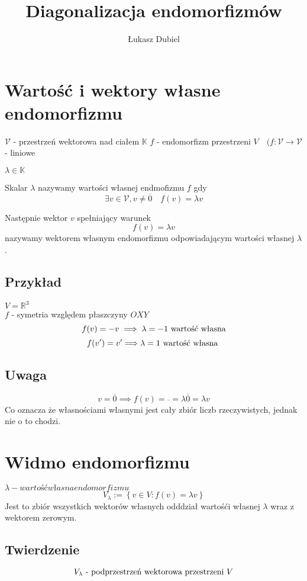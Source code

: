 \documentclass[11pt]{article}
\author{Łukasz Dubiel}
\title{Diagonalizacja endomorfizmów}
\begin{document}
\maketitle

\section{Wartość i wektory własne endomorfizmu}

$\mathcal{V}$ - przestrzeń wektorowa nad ciałem $\mathbb{K}$
$f$ - endomorfizm przestrzeni $V \quad (f : \mathcal{V} \to \mathcal{V}$ - liniowe

$ \lambda \in \mathbb{K} $

Skalar $\lambda$ nazywamy wartości własnej endmofizmu $f$ gdy $$ \exists v \in \mathcal{V}, v \not = \overline{0} \quad f(v) = \lambda v $$

Następnie wektor $v$ spełniający warunek $$ f(v) = \lambda v$$ nazywamy wektorem własnym endomorfizmu odpowiadającym wartości własnej $\lambda$. 

\subsection{Przykład}
$ V = \mathbb{R}^3 $ \\
$f$ - symetria względem płaszczyny $OXY$ 
$$ f(v) = -v \implies \lambda =  -1 \hbox{ wartość własna} $$
$$ f(v') = v' \Longrightarrow \lambda =  1 \hbox{ wartość własna } $$

\subsection{Uwaga}
$$ v = \overline{0}  \implies f(v) = \overline{} = \lambda \overline{0} = \lambda v $$
Co oznacza że własnościami własnymi jest cały zbiór liczb rzeczywistych, jednak nie o to chodzi. 

\section{Widmo endomorfizmu}
$ \lambda - wartość własna endomorfizmu $
$$ V_{\lambda} := \left\{ v \in V : f(v) = \lambda v \right\} $$
Jest to zbiór wszystkich wektorów własnych odddział wartośći własnej $\lambda$ wraz z wektorem zerowym.

\subsection{Twierdzenie} 
$$ V_\lambda \hbox{ - podprzestrzeń wektorowa przestrzeni } V $$
\end{document}
